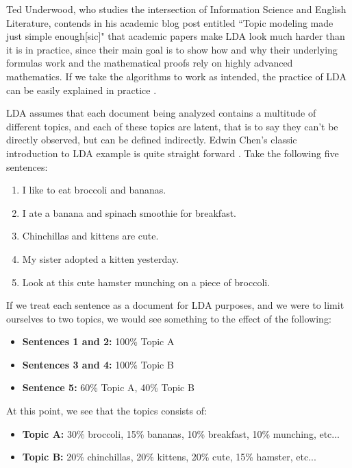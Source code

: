 Ted Underwood, who studies the intersection of Information Science and English Literature, contends in his academic blog post entitled ``Topic modeling made just simple enough[sic]" that academic papers make LDA look much harder than it is in practice, since their main goal is to show how and why their underlying formulas work and the mathematical proofs rely on highly advanced mathematics. If we take the algorithms to work as intended, the practice of LDA can be easily explained in practice \citep{Underwood2012}.

LDA assumes that each document being analyzed contains a multitude of different topics, and each of these topics are latent, that is to say they can't be directly observed, but can be defined indirectly. Edwin Chen's classic introduction to LDA example is quite straight forward \citep{Chen2011}.  Take the following five sentences:

\begin{enumerate}
	\singlespacing 
	\item I like to eat broccoli and bananas.
	\item I ate a banana and spinach smoothie for breakfast.
	\item Chinchillas and kittens are cute.
	\item My sister adopted a kitten yesterday.
	\item Look at this cute hamster munching on a piece of broccoli.
\end{enumerate}

If we treat each sentence as a document for LDA purposes, and we were to limit ourselves to two topics, we would see something to the effect of the following:

\begin{itemize}
	\item \textbf{Sentences 1 and 2:} 100\% Topic A
	\item \textbf{Sentences 3 and 4:} 100\% Topic B
	\item \textbf{Sentence 5:} 60\% Topic A, 40\% Topic B
\end{itemize}

At this point, we see that the topics consists of:
\begin{itemize}	
	\item \textbf{Topic A:} 30\% broccoli, 15\% bananas, 10\% breakfast, 10\% munching, etc... 
	
	\item \textbf{Topic B:} 20\% chinchillas, 20\% kittens, 20\% cute, 15\% hamster, etc...  
\end{itemize}

